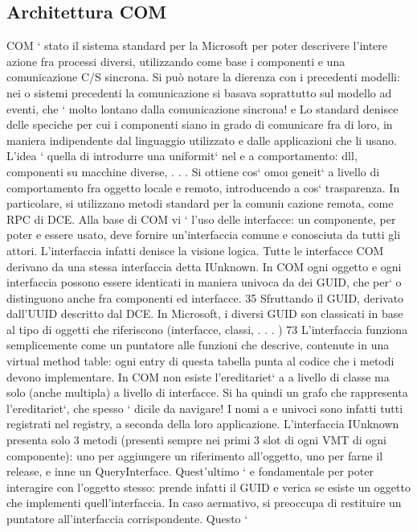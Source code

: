 \documentclass[a4paper,12pt]{article}
\begin{document}
\subsection{Architettura COM}
COM ` stato il sistema standard per la Microsoft per poter descrivere l'intere
azione fra processi diversi, utilizzando come base i componenti e una comunicazione C/S sincrona. Si può notare la
dierenza con i precedenti modelli: nei
o
sistemi precedenti la comunicazione si basava soprattutto sul modello ad eventi,
che ` molto lontano dalla comunicazione sincrona!
e
Lo standard denisce delle speciche per cui i componenti siano in grado
di comunicare fra di loro, in maniera indipendente dal linguaggio utilizzato e
dalle applicazioni che li usano. L'idea ` quella di introdurre una uniformit` nel
e
a
comportamento: dll, componenti su macchine diverse, . . . Si ottiene cos` omo\i{}
geneit` a livello di comportamento fra oggetto locale e remoto, introducendo
a
cos` trasparenza. In particolare, si utilizzano metodi standard per la comuni\i{}
cazione remota, come RPC di DCE.
Alla base di COM vi ` l'uso delle interfacce: un componente, per poter
e
essere usato, deve fornire un'interfaccia comune e conosciuta da tutti gli attori. L'interfaccia infatti denisce la
visione logica. Tutte le interfacce COM
derivano da una stessa interfaccia detta IUnknown. In COM ogni oggetto e ogni
interfaccia possono essere identicati in maniera univoca da dei GUID, che per`
o
distinguono anche fra componenti ed interfacce.
35 Sfruttando il GUID, derivato dall'UUID descritto dal DCE. In Microsoft, i diversi GUID
son classicati in base al tipo di oggetti che riferiscono (interfacce, classi, . . . )
73
L'interfaccia funziona semplicemente come un puntatore alle funzioni che descrive, contenute in una virtual method
table: ogni entry di questa tabella punta
al codice che i metodi devono implementare. In COM non esiste l'ereditariet`
a
a livello di classe ma solo (anche multipla) a livello di interfacce. Si ha quindi
un grafo che rappresenta l'ereditariet`, che spesso ` dicile da navigare! I nomi
a
e
univoci sono infatti tutti registrati nel registry, a seconda della loro applicazione.
L'interfaccia IUnknown presenta solo 3 metodi (presenti sempre nei primi
3 slot di ogni VMT di ogni componente): uno per aggiungere un riferimento
all'oggetto, uno per farne il release, e inne un QueryInterface. Quest'ultimo `
e
fondamentale per poter interagire con l'oggetto stesso: prende infatti il GUID e
verica se esiste un oggetto che implementi quell'interfaccia. In caso aermativo,
si preoccupa di restituire un puntatore all'interfaccia corrispondente. Questo `
\end{document}

